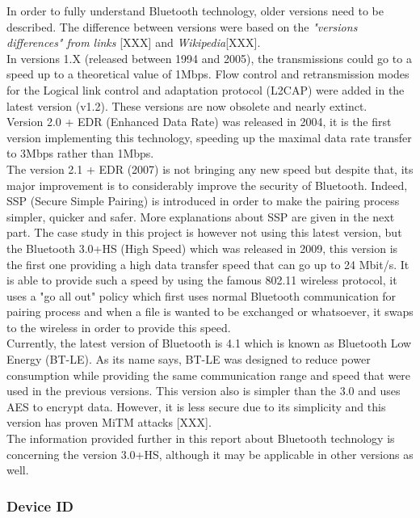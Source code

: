 In order to fully understand Bluetooth technology, older versions need to be described. The difference between versions were based on the \textit{"versions differences" from links} [XXX] and \textit{Wikipedia}[XXX].\\
In versions 1.X (released between 1994 and 2005), the transmissions could go to a speed up to a theoretical value of 1Mbps. Flow control and retransmission modes for the Logical link control and adaptation protocol (L2CAP) were added in the latest version (v1.2). These versions are now obsolete and nearly extinct.\\
Version 2.0 + EDR (Enhanced Data Rate) was released in 2004, it is the first version implementing this technology, speeding up the maximal data rate transfer to 3Mbps rather than 1Mbps.\\
The version 2.1 + EDR (2007) is not bringing any new speed but despite that, its major improvement is to considerably improve the security of Bluetooth. Indeed, SSP (Secure Simple Pairing) is introduced in order to make the pairing process simpler, quicker and safer. More explanations about SSP are given in the next part.\newpage
The case study in this project is however not using this latest version, but the Bluetooth 3.0+HS (High Speed) which was released in 2009, this version is  the first one providing a high data transfer speed that can go up to 24 Mbit/s. It is able to provide such a speed by using the famous 802.11 wireless protocol, it uses a "go all out" policy which first uses normal Bluetooth communication for pairing process and when a file is wanted to be exchanged or whatsoever,  it swaps to the wireless in order to provide this speed.\\
Currently, the latest version of Bluetooth is 4.1 which is known as Bluetooth Low Energy (BT-LE). As its name says, BT-LE was designed to reduce power consumption while providing the same communication range and speed that were used in the previous versions. This version also is simpler than the 3.0 and uses AES to encrypt data. However, it is less secure due to its simplicity and this version has proven MiTM attacks [XXX].\\
The information provided further in this report about Bluetooth technology is concerning the version 3.0+HS, although it may be applicable in other versions as well.

\subsubsection{Device ID}

